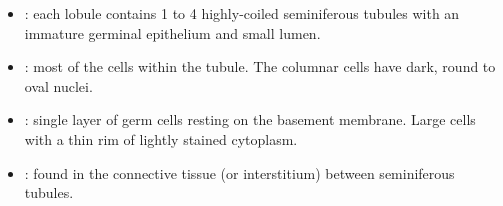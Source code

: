 \begin{multicols}{2}
\begin{itemize}
  \item {}: each lobule contains 1 to 4 highly-coiled seminiferous tubules with an immature germinal epithelium and small lumen. 
  
  \begin{center}
  \end{center}
  
  \item {}: most of the cells within the tubule. The columnar cells have dark, round to oval nuclei.
  
  \begin{center}
  \end{center}
  
  \item {}: single layer of germ cells resting on the basement membrane. Large cells with a thin rim of lightly stained cytoplasm.
  
  \begin{center}
  \end{center}
  
  \item {}: found in the connective tissue (or interstitium) between seminiferous tubules. 
  
  \begin{center}
  \end{center}
  
\end{itemize}
\end{multicols}

\newpage

